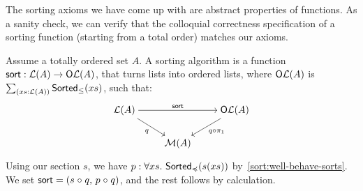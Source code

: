 The sorting axioms we have come up with are abstract properties of functions.
%
As a sanity check, we can verify that the colloquial correctness specification of a sorting function (starting from a
total order) matches our axioms.
%
\begin{proposition}
    \label{prop:sort-correctness}
    Assume a totally ordered set $A$.
    A sorting algorithm is a function $\operatorname{\mathsf{sort}} : \mathcal{L}(A) \to \mathsf{O}\mathcal{L}(A)$,
    that turns lists into ordered lists,
    where $\mathsf{O}\mathcal{L}(A)$ is $\dsum{xs : \LL(A)}{\term{Sorted}_{\leq}(xs)}$,
    such that:
    \[\begin{tikzcd}[ampersand replacement=\&,cramped]
            {\LL(A)} \&\& {\type{O}\LL(A)} \\
            \& {\MM(A)}
            \arrow["{\term{sort}}", from=1-1, to=1-3]
            \arrow["q"', from=1-1, to=2-2]
            \arrow["{q \comp \pi_1}", from=1-3, to=2-2]
        \end{tikzcd}\]
\end{proposition}
\begin{proofsketch}
    Using our section $s$,
    we have $p : \forall xs.\,\operatorname{\mathsf{Sorted}}_{\preccurlyeq}(s(xs))$ by~\cref{sort:well-behave-sorts}.
    We set $\operatorname{\mathsf{sort}} = (s \mathrel{\circ} q ,\,p \mathrel{\circ} q)$, and the rest follows by calculation.
\end{proofsketch}
